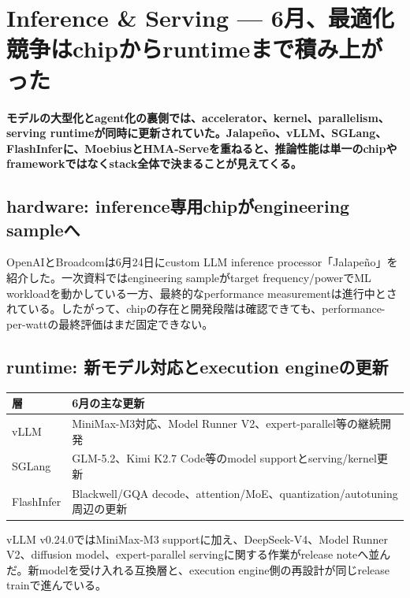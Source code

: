 \section{Inference \& Serving — 6月、最適化競争はchipからruntimeまで積み上がった}
\noindent\textbf{モデルの大型化とagent化の裏側では、accelerator、kernel、parallelism、serving runtimeが同時に更新されていた。Jalapeño、vLLM、SGLang、FlashInferに、MoebiusとHMA-Serveを重ねると、推論性能は単一のchipやframeworkではなくstack全体で決まることが見えてくる。}\autocite{src-272a6dac5bcc,src-43606e2afafd,src-538cecdad845,src-6cc910fb0183,src-855db08b75f6,src-a66d76643eee}

\subsection{hardware: inference専用chipがengineering sampleへ}

OpenAIとBroadcomは6月24日にcustom LLM inference processor「Jalapeño」を紹介した。一次資料ではengineering sampleがtarget frequency/powerでML workloadを動かしている一方、最終的なperformance measurementは進行中とされている。したがって、chipの存在と開発段階は確認できても、performance-per-wattの最終評価はまだ固定できない。\autocite{src-855db08b75f6}


\subsection{runtime: 新モデル対応とexecution engineの更新}

\begin{center}
\small
\begin{tabularx}{\columnwidth}{>{\raggedright\arraybackslash}X|>{\raggedright\arraybackslash}X}
\toprule
\textbf{層} & \textbf{6月の主な更新} \\
\midrule
vLLM & MiniMax-M3対応、Model Runner V2、expert-parallel等の継続開発 \\
SGLang & GLM-5.2、Kimi K2.7 Code等のmodel supportとserving/kernel更新 \\
FlashInfer & Blackwell/GQA decode、attention/MoE、quantization/autotuning周辺の更新 \\
\bottomrule
\end{tabularx}
\autocite{src-272a6dac5bcc,src-538cecdad845,src-6cc910fb0183}
\end{center}

vLLM v0.24.0ではMiniMax-M3 supportに加え、DeepSeek-V4、Model Runner V2、diffusion model、expert-parallel servingに関する作業がrelease noteへ並んだ。新modelを受け入れる互換層と、execution engine側の再設計が同じrelease trainで進んでいる。\autocite{src-6cc910fb0183}


